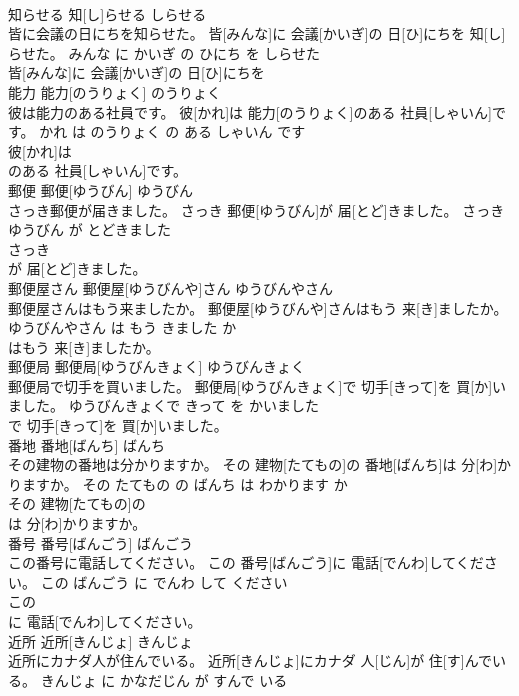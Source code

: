 \documentclass[8pt]{extreport}
\begin{document}
\begin{CJK}{UTF8}{min}
\\	知らせる	知[し]らせる	しらせる	
\\	皆に会議の日にちを知らせた。	皆[みんな]に 会議[かいぎ]の 日[ひ]にちを 知[し]らせた。	みんな に かいぎ の ひにち を しらせた	
\\	皆[みんな]に 会議[かいぎ]の 日[ひ]にちを
\\	能力	能力[のうりょく]	のうりょく	
\\	彼は能力のある社員です。	彼[かれ]は 能力[のうりょく]のある 社員[しゃいん]です。	かれ は のうりょく の ある しゃいん です	
\\	彼[かれ]は
\\	のある 社員[しゃいん]です。			
\\	郵便	郵便[ゆうびん]	ゆうびん	
\\	さっき郵便が届きました。	さっき 郵便[ゆうびん]が 届[とど]きました。	さっき ゆうびん が とどきました	
\\	さっき
\\	が 届[とど]きました。			
\\	郵便屋さん	郵便屋[ゆうびんや]さん	ゆうびんやさん	
\\	郵便屋さんはもう来ましたか。	郵便屋[ゆうびんや]さんはもう 来[き]ましたか。	ゆうびんやさん は もう きました か	
\\	はもう 来[き]ましたか。			
\\	郵便局	郵便局[ゆうびんきょく]	ゆうびんきょく	
\\	郵便局で切手を買いました。	郵便局[ゆうびんきょく]で 切手[きって]を 買[か]いました。	ゆうびんきょくで きって を かいました	
\\	で 切手[きって]を 買[か]いました。			
\\	番地	番地[ばんち]	ばんち	
\\	その建物の番地は分かりますか。	その 建物[たてもの]の 番地[ばんち]は 分[わ]かりますか。	その たてもの の ばんち は わかります か	
\\	その 建物[たてもの]の
\\	は 分[わ]かりますか。			
\\	番号	番号[ばんごう]	ばんごう	
\\	この番号に電話してください。	この 番号[ばんごう]に 電話[でんわ]してください。	この ばんごう に でんわ して ください	
\\	この
\\	に 電話[でんわ]してください。			
\\	近所	近所[きんじょ]	きんじょ	
\\	近所にカナダ人が住んでいる。	近所[きんじょ]にカナダ 人[じん]が 住[す]んでいる。	きんじょ に かなだじん が すんで いる	

\end{CJK}
\end{document}
